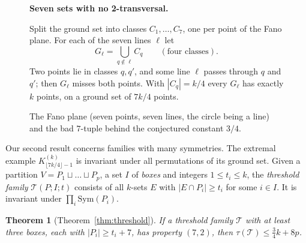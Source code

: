 \documentclass[11pt]{amsart}
\newtheorem{theorem}{Theorem}[section]
\theoremstyle{definition}
\theoremstyle{remark}
\begin{document}
\begin{figure}[t]
\centering
\begin{minipage}{0.4\textwidth}\centering
{}
\end{minipage}\hfill
\begin{minipage}{0.55\textwidth}\small
\textbf{Seven sets with no 2-transversal.}\par\smallskip
    Split the ground set into classes $C_1,\dots,C_7$, one per point of the Fano plane. For each of the seven lines $\ell$ let
    \[G_\ell=\textstyle\bigcup_{q\notin\ell}C_q\qquad(\text{four classes}).\]
    Two points lie in classes $q,q'$, and some line $\ell$ passes through $q$ and $q'$; then $G_\ell$ misses both points. With $|C_q|=k/4$ every $G_\ell$ has exactly $k$ points, on a ground set of $7k/4$ points.
\end{minipage}
\caption{The Fano plane (seven points, seven lines, the circle being a line) and the bad $7$-tuple behind the conjectured constant $3/4$.}\label{fig:fano}
\end{figure}

Our second result concerns families with many symmetries. The extremal example $K^{(k)}_{\lfloor7k/4\rfloor-1}$ is invariant under all permutations of its ground set. Given a partition $V=P_1\sqcup\dots\sqcup P_p$, a set $I$ of \emph{boxes} and integers $1\le t_i\le k$, the \emph{threshold family} $\mathcal T(P;I;t)$ consists of all $k$-sets $E$ with $|E\cap P_i|\ge t_i$ for some $i\in I$. It is invariant under $\prod_i\mathrm{Sym}(P_i)$.

\begin{theorem}[Theorem~\ref{thm:threshold}]\label{thm:intro-threshold}
If a threshold family $\mathcal T$ with at least three boxes, each with $|P_i|\ge t_i+7$, has property $(7,2)$, then $\tau(\mathcal T)\le\frac34k+8p$.
\end{theorem}
\end{document}

